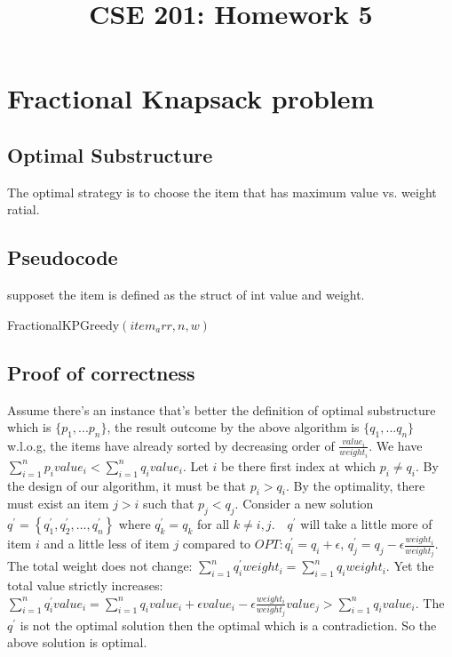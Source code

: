 \documentclass[a4paper]{article}
\title{CSE 201: Homework 5}
\begin{document}
\maketitle
\section{Fractional Knapsack problem}
\subsection{Optimal Substructure}
The optimal strategy is to choose the item that has maximum value vs. weight ratial.

\subsection{Pseudocode}
supposet the item is defined as the struct of int value and weight.
\begin{algorithm}
  \caption{FractionalKPGreedy$(item_arr,n,w)$}\label{alg:cap3}
  \begin{algorithmic}[1]
    \Else
    \EndIf
    \EndFor
  \end{algorithmic}
\end{algorithm}
\subsection{Proof of correctness}
Assume there's an instance that's better the definition of optimal substructure which is $\{p_1,...p_n\}$, the result outcome by the above algorithm is $\{q_1,...q_n\}$ w.l.o.g, the items have already sorted by decreasing order of $\frac{value_i}{weight_i}$. We have $\sum_{i=1}^n p_i value_i<\sum_{i=1}^n q_i value_i$. Let $i$ be there first index at which $p_i \neq q_i$. By the design of our algorithm, it must be that $p_i>q_i$. By the optimality, there must exist an item $j>i$ such that $p_j<q_j$. Consider a new solution $q^{\prime}=\left\{q_1^{\prime}, q_2^{\prime}, \ldots, q_n^{\prime}\right\}$ where $q_k^{\prime}=q_k$ for all $k \neq i, j . \quad q^{\prime}$ will take a little more of item $i$ and a little less of item $j$ compared to $O P T: q_i^{\prime}=q_i+\epsilon$, $q_j^{\prime}=q_j-\epsilon \frac{weight_i}{weight_j}$. The total weight does not change: $\sum_{i=1}^n q_i^{\prime} weight_i=\sum_{i=1}^n q_i weight_i$. Yet the total value strictly increases: $\sum_{i=1}^n q_i^{\prime} value_i=\sum_{i=1}^n q_i value_i+\epsilon value_i-\epsilon \frac{weight_i}{weight_j} value_j>\sum_{i=1}^n q_i value_i$. The $q^{\prime}$ is not the optimal solution then the optimal which is a contradiction. So the above solution is optimal.
\end{document}
